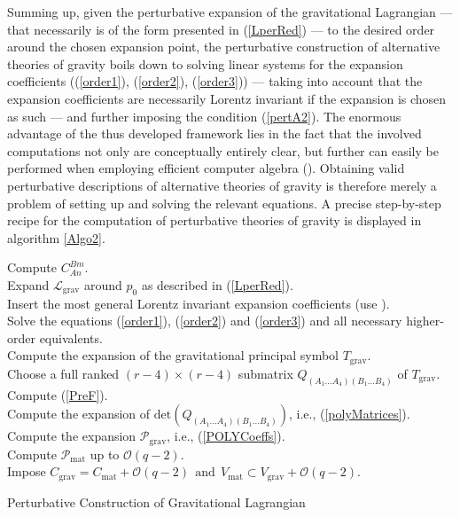 \documentclass[%
 reprint,
nofootinbib,
 amsmath,amssymb,
 aps,
 prd,
floatfix,
]{revtex4-2}
\begin{document}
Summing up, given the perturbative expansion of the gravitational Lagrangian --- that necessarily is of the form presented in (\ref{LperRed}) --- to the desired order around the chosen expansion point, the perturbative construction of alternative theories of gravity boils down to solving linear systems for the expansion coefficients ((\ref{order1}), (\ref{order2}), (\ref{order3})) --- taking into account that the expansion coefficients are necessarily Lorentz invariant if the expansion is chosen as such --- and further imposing the condition
(\ref{pertA2}). The enormous advantage of the thus developed framework lies in the fact that the involved computations not only are conceptually entirely clear, but further can easily be performed when employing efficient computer algebra (\cite{sparse-tensor}). Obtaining valid perturbative descriptions of alternative theories of gravity is therefore merely a problem of setting up and solving the relevant equations. A precise step-by-step recipe for the computation of perturbative theories of gravity is displayed in algorithm \ref{Algo2}.
\begin{algorithm}[hbt!]
\SetAlgoLined
{}
Compute $C^{Bm}_{An}$. \\
Expand $\mathcal{L}_{\text{grav}}$ around $p_0$ as described in (\ref{LperRed}).\\
Insert the most general Lorentz invariant expansion coefficients (use \cite{sparse-tensor}).\\
Solve the equations (\ref{order1}), (\ref{order2}) and (\ref{order3}) and all necessary higher-order equivalents.\\
Compute the expansion of the gravitational principal symbol $T_{\text{grav}}$.\\
Choose a full ranked $(r-4) \times (r-4)$ submatrix $Q_{(A_1...A_4)(B_1...B_4)}$ of $T_{\text{grav}}$. \\
Compute (\ref{PreF}).\\
Compute the expansion of $\mathrm{det}(Q_{(A_1...A_4)(B_1...B_4)})$, i.e., (\ref{polyMatrices}). \\
Compute the expansion $\mathcal{P}_{\text{grav}}$, i.e., (\ref{POLYCoeffs}). \\
Compute $\mathcal{P}_{\text{mat}}$ up to $\mathcal{O}(q-2)$.\\
Impose $C_{\text{grav}} = C_{\text{mat}} + \mathcal{O}(q-2) \ \ \text{and} \ \ V_{\text{mat}} \subset V_{\text{grav}} + \mathcal{O}(q-2)$.
 \caption{Perturbative Construction of Gravitational Lagrangian}\label{Algo2}
\end{algorithm}
\end{document}
